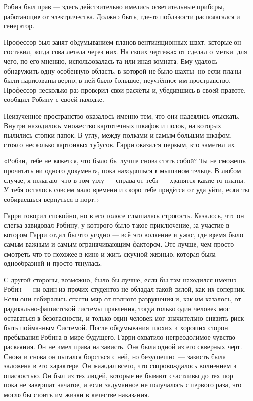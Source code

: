 \documentclass[a4paper,12pt]{book}
\begin{document}
\par
Робин был прав — здесь действительно имелись осветительные приборы, работающие от электричества. Должно быть, где-то поблизости располагался и генератор.\\
\par
Профессор был занят обдумыванием планов вентиляционных шахт, которые он составил, когда сова летела через них. На своих чертежах от сделал отметки, для чего, по его мнению, использовалась та или иная комната. Ему удалось обнаружить одну особенную область, в которой не было шахты, но если планы были нарисованы верно, в ней было большое, неучтённое им пространство. Профессор несколько раз проверил свои расчёты и, убедившись в своей правоте, сообщил Робину о своей находке.\\
\par
Неизученное пространство оказалось именно тем, что они надеялись отыскать. Внутри находилось множество картотечных шкафов и полок, на которых пылились стопки папок. В углу, между полками и самым большим шкафом, стояло несколько картонных тубусов. Гарри оказался первым, кто заметил их.
\par
«Робин, тебе не кажется, что было бы лучше снова стать собой? Ты не сможешь прочитать ни одного документа, пока находишься в мышином тельце. В любом случае, я полагаю, что в том углу — справа от тебя — хранятся какие-то планы. У тебя осталось совсем мало времени и скоро тебе придётся оттуда уйти, если ты собираешься вернуться в порт.»
\par
Гарри говорил спокойно, но в его голосе слышалась строгость. Казалось, что он слегка завидовал Робину, у которого было такое приключение, за участие в котором Гарри отдал бы что угодно — всё это волнение и ужас, где время было самым важным и самым ограничивающим фактором. Это лучше, чем просто смотреть что-то похожее в кино и жить скучной жизнью, которая была однообразной и просто тянулась.
\par
С другой стороны, возможно, было бы лучше, если бы там находился именно Робин — ни один из прочих студентов не обладал такой силой, как их соперник. Если они собирались спасти мир от полного разрушения и, как им казалось, от радикально-фашистской системы правления, тогда только один человек мог оставаться в безопасности, и только один человек мог значительно снизить риск быть пойманным Системой. После обдумывания плохих и хороших сторон пребывания Робина в мире будущего, Гарри охватило непреодолимое чувство раскаяния. Он не имел права на зависть. Она была одной из его скверных черт. Снова и снова он пытался бороться с ней, но безуспешно — зависть была заложена в его характере. Он жаждал всего, что сопровождалось волнением и опасностью. Он был из тех людей, которые не бывают счастливы до тех пор, пока не завершат начатое, и если задуманное не получалось с первого раза, это могло бы стоить им жизни в качестве наказания.
\end{document}
